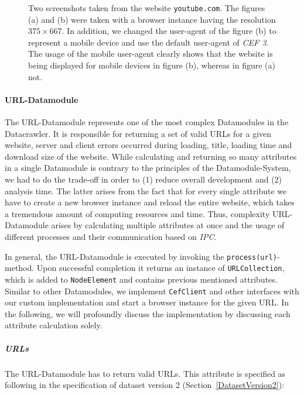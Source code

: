 \begin{figure}
\begin{subfigure}{0.6\textwidth}
		\caption{}
		\label{compare_useragent}
	\end{subfigure}
	\caption[Mobile and Desktop Screenshot taken by the Datacrawler]{Two screenshots taken from the website \texttt{youtube.com}. The figures (a) and (b) were taken with a browser instance having the resolution $375 \times 667$. In addition, we changed the user-agent of the figure (b) to represent a mobile device and use the default user-agent of \textit{CEF 3}. The usage of the mobile user-agent clearly shows that the website is being displayed for mobile devices in figure (b), whereas in figure (a) not.}
	\label{compare_resolution_useragent}
\end{figure}

\paragraph*{URL-Datamodule}
\label{datacrawler_url_datamodule}
The URL-Datamodule represents one of the most complex Datamodules in the Datacrawler. It is responsible for returning a set of valid URLs for a given website, server and client errors occurred during loading, title, loading time and download size of the website. While calculating and returning so many attributes in a single Datamodule is contrary to the principles of the Datamodule-System, we had to do the trade-off in order to (1) reduce overall development and (2) analysis time. The latter arises from the fact that for every single attribute we have to create a new browser instance and reload the entire website, which takes a tremendous amount of computing resources and time. Thus, complexity URL-Datamodule arises by calculating multiple attributes at once and the usage of different processes and their communication based on \textit{IPC}.

In general, the URL-Datamodule is executed by invoking the \texttt{process(url)}-method. Upon successful completion it returns an instance of \texttt{URLCollection}, which is added to \texttt{NodeElement} and contains previous mentioned attributes. Similar to other Datamodules, we implement \texttt{CefClient} and other interfaces with our custom implementation and start a browser instance for the given URL. In the following, we will profoundly discuss the implementation by discussing each attribute calculation solely.

\subparagraph*{URLs}
The URL-Datamodule has to return valid URLs. This attribute is specified as following in the specification of dataset version 2 (Section~\ref{DatasetVersion2}):

